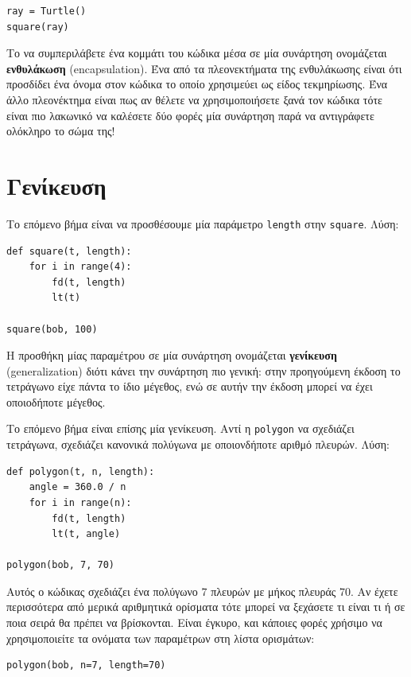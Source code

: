 \documentclass[10pt]{book}
\begin{document}
\begin{verbatim}
ray = Turtle()
square(ray)
\end{verbatim}
%

Το να συμπεριλάβετε ένα κομμάτι του κώδικα μέσα σε μία συνάρτηση ονομάζεται {\bf ενθυλάκωση} (encapsulation). Ένα από τα πλεονεκτήματα της ενθυλάκωσης είναι ότι προσδίδει ένα όνομα στον κώδικα το οποίο χρησιμεύει ως είδος τεκμηρίωσης. Ένα άλλο πλεονέκτημα είναι πως αν θέλετε να χρησιμοποιήσετε ξανά τον κώδικα τότε είναι πιο λακωνικό να καλέσετε δύο φορές μία συνάρτηση παρά να αντιγράφετε ολόκληρο το σώμα της!


\section{Γενίκευση}

Το επόμενο βήμα είναι να προσθέσουμε μία παράμετρο  {\tt length}  στην  {\tt square}. Λύση:


\begin{verbatim}
def square(t, length):
    for i in range(4):
        fd(t, length)
        lt(t)

square(bob, 100)
\end{verbatim}
%

Η προσθήκη μίας παραμέτρου σε μία συνάρτηση ονομάζεται {\bf γενίκευση} (generalization) διότι κάνει την συνάρτηση πιο γενική:  στην προηγούμενη έκδοση το τετράγωνο είχε πάντα το ίδιο μέγεθος, ενώ σε αυτήν την έκδοση μπορεί να έχει οποιοδήποτε μέγεθος.

Το επόμενο βήμα είναι επίσης μία γενίκευση. Αντί η {\tt polygon} να σχεδιάζει τετράγωνα, σχεδιάζει κανονικά πολύγωνα με οποιονδήποτε αριθμό πλευρών. Λύση:


\begin{verbatim}
def polygon(t, n, length):
    angle = 360.0 / n
    for i in range(n):
        fd(t, length)
        lt(t, angle)

polygon(bob, 7, 70)
\end{verbatim}
%

Αυτός ο κώδικας σχεδιάζει ένα πολύγωνο 7 πλευρών με μήκος πλευράς 70. Αν έχετε περισσότερα από μερικά αριθμητικά ορίσματα τότε μπορεί να ξεχάσετε τι είναι τι ή σε ποια σειρά θα πρέπει να βρίσκονται. Είναι έγκυρο, και κάποιες φορές χρήσιμο να χρησιμοποιείτε τα ονόματα των παραμέτρων στη λίστα ορισμάτων:

\begin{verbatim}
polygon(bob, n=7, length=70)
\end{verbatim}
%
\end{document}
